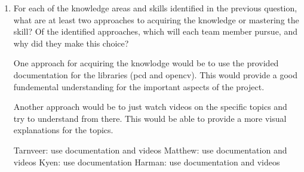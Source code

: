 \begin{enumerate}
\item For each of the knowledge areas and skills identified in the previous question, what are at least two approaches to acquiring the knowledge or mastering the skill?  Of the identified approaches, which
will each team member pursue, and why did they make this choice?

One approach for acquiring the knowlodge would be to use the provided documentation for the libraries (pcd and opencv). This would provide a good fundemental understanding for the important aspects of the project. 

Another approach would be to just watch videos on the specific topics and try to understand from there. This would be able to provide a more visual explanations for the topics.

Tarnveer: use documentation and videos
Matthew: use documentation and videos 
Kyen: use documentation
Harman: use documentation and videos

\end{enumerate}